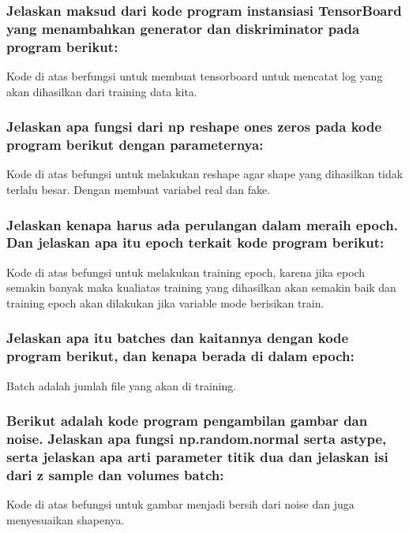 \subsubsection{Jelaskan maksud dari kode program instansiasi TensorBoard yang menambahkan generator dan diskriminator pada program berikut:}
\hfill\break

Kode di atas berfungsi untuk membuat tensorboard untuk mencatat log yang akan dihasilkan dari training data kita.

\subsubsection{Jelaskan apa fungsi dari np reshape ones zeros pada kode program berikut dengan parameternya:}
\hfill\break

Kode di atas befungsi untuk melakukan reshape agar shape yang dihasilkan tidak terlalu besar. Dengan membuat variabel real dan fake.

\subsubsection{Jelaskan kenapa harus ada perulangan dalam meraih epoch. Dan jelaskan apa itu epoch terkait kode program berikut:}
\hfill\break

Kode di atas befungsi untuk melakukan training epoch, karena jika epoch semakin banyak maka kualiatas training yang dihasilkan akan semakin baik dan training epoch akan dilakukan jika variable mode berisikan train.

\subsubsection{Jelaskan apa itu batches dan kaitannya dengan kode program berikut, dan kenapa berada di dalam epoch:}
\hfill\break

Batch adalah jumlah file yang akan di training.

\subsubsection{Berikut adalah kode program pengambilan gambar dan noise. Jelaskan apa fungsi np.random.normal serta astype, serta jelaskan apa arti parameter titik dua dan jelaskan isi dari z sample dan volumes batch:}
\hfill\break

Kode di atas befungsi untuk gambar menjadi bersih dari noise dan juga menyesuaikan shapenya.

